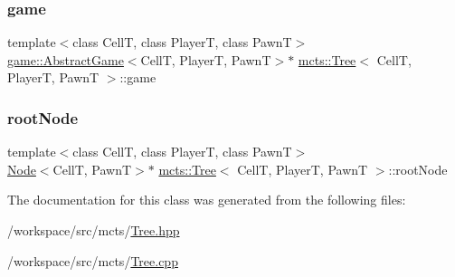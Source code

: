 \mbox{\label{classmcts_1_1_tree_a39aa3a398cd8a0c431ffd39fbe4965f6}} 
\subsubsection{\texorpdfstring{game}{game}}
{\footnotesize\ttfamily template$<$class CellT, class PlayerT, class PawnT$>$ \\
\hyperlink{classgame_1_1_abstract_game}{game\+::\+Abstract\+Game}$<$CellT, PlayerT, PawnT$>$$\ast$ \hyperlink{classmcts_1_1_tree}{mcts\+::\+Tree}$<$ CellT, PlayerT, PawnT $>$\+::game}

\mbox{\label{classmcts_1_1_tree_a96e2576ffcf962ad46140e100586ca81}} 
\subsubsection{\texorpdfstring{root\+Node}{rootNode}}
{\footnotesize\ttfamily template$<$class CellT, class PlayerT, class PawnT$>$ \\
\hyperlink{structmcts_1_1_node}{Node}$<$CellT, PawnT$>$$\ast$ \hyperlink{classmcts_1_1_tree}{mcts\+::\+Tree}$<$ CellT, PlayerT, PawnT $>$\+::root\+Node\hspace{0.3cm}{\ttfamily [protected]}}



The documentation for this class was generated from the following files\+:\begin{DoxyCompactItemize}
\item 
/workspace/src/mcts/\hyperlink{_tree_8hpp}{Tree.\+hpp}\item 
/workspace/src/mcts/\hyperlink{_tree_8cpp}{Tree.\+cpp}\end{DoxyCompactItemize}
